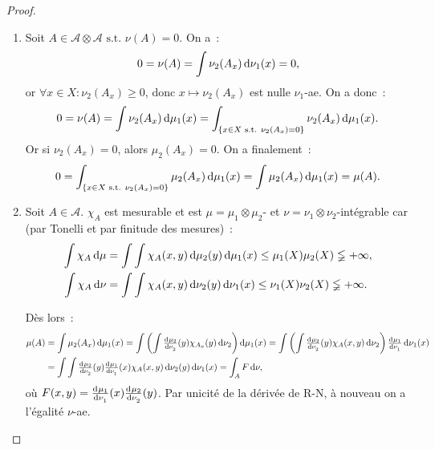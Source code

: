 \documentclass{article}
\newcommand{\pinfty}{{+\infty}}
\newcommand{\st}{\text{ s.t. }}
\begin{document}
\begin{proof}~
\begin{enumerate}
	\item Soit $A \in \mathcal A \otimes \mathcal A \st \nu(A) = 0$. On a~:
	\[0 = \nu(A) = \int\nu_2(A_x)\dif\nu_1(x) = 0,\]
	or $\forall x \in X : \nu_2(A_x) \geq 0$, donc $x \mapsto \nu_2(A_x)$ est nulle $\nu_1$-ae. On a donc~:
	\[0 = \nu(A) = \int\nu_2(A_x)\dif\mu_1(x) = \int_{\{x \in X \st \nu_2(A_x) = 0\}}\nu_2(A_x)\dif\mu_1(x).\]
	Or si $\nu_2(A_x) = 0$, alors $\mu_2(A_x) = 0$. On a finalement~:
	\[0 = \int_{\{x \in X \st \nu_2(A_x) = 0\}}\mu_2(A_x)\dif\mu_1(x) = \int \mu_2(A_x)\dif\mu_1(x) = \mu(A).\]

	\item Soit $A \in \mathcal A$. $\chi_A$ est mesurable et est $\mu = \mu_1 \otimes \mu_2$- et $\nu = \nu_1 \otimes \nu_2$-intégrable car (par Tonelli et par finitude des mesures)~:
	\begin{align*}
		\int\chi_A\dif\mu &= \int\int\chi_A(x, y)\dif\mu_2(y)\dif\mu_1(x) \leq \mu_1(X)\mu_2(X) \lneqq \pinfty, \\
		\int\chi_A\dif\nu &= \int\int\chi_A(x, y)\dif\nu_2(y)\dif\nu_1(x) \leq \nu_1(X)\nu_2(X) \lneqq \pinfty.
	\end{align*}

	Dès lors~:
	\begin{align*}
		\mu(A) &= \int\mu_2(A_x)\dif\mu_1(x) = \int\left(\int\od {\mu_2}{\nu_2}(y)\chi_{A_x}(y)\dif\nu_2\right)\dif\mu_1(x)
			= \int\left(\int\od {\mu_2}{\nu_2}(y)\chi_A(x, y)\dif\nu_2\right)\od {\mu_1}{\nu_1}\dif\nu_1(x) \\
		&= \int\int\od {\mu_2}{\nu_2}(y)\od {\mu_1}{\nu_1}(x)\chi_A(x, y)\dif\nu_2(y)\dif\nu_1(x) = \int_AF\dif\nu,
	\end{align*}
	où $F(x, y) = \od {\mu_1}{\nu_1}(x)\od {\mu_2}{\nu_2}(y)$. Par unicité de la dérivée de R-N, à nouveau on a l'égalité $\nu$-ae.
\end{enumerate}
\end{proof}
\end{document}
